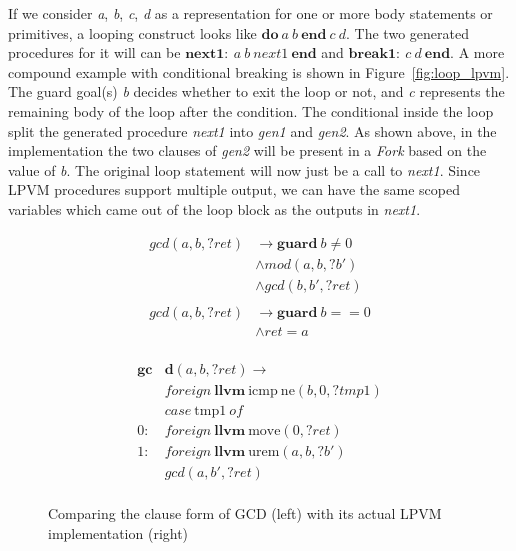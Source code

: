 If we consider \textit{a}, \textit{b}, \textit{c}, \textit{d} as a
representation for one or more body statements or primitives, a looping
construct looks like \( \mathbf{do}\ a\ b\ \mathbf{end}\ c\ d\). The two
generated procedures for it will can be
\( \mathbf{next1:}\ a\ b\ next1\ \mathbf{end} \) and
\( \mathbf{break1:}\ c\ d\ \mathbf{end} \). A more compound example with
conditional breaking is shown in Figure~\ref{fig:loop_lpvm}. The guard goal(s)
\textit{b} decides whether to exit the loop or not, and \textit{c} represents
the remaining body of the loop after the condition. The conditional inside the
loop split the generated procedure \textit{next1} into \textit{gen1} and
\textit{gen2}. As shown above, in the implementation the two clauses of
\textit{gen2} will be present in a \textit{Fork} based on the value of
\textit{b}. The original loop statement will now just be a call to
\textit{next1}. Since LPVM procedures support multiple output, we can have the
same scoped variables which came out of the loop block as the outputs in
\textit{next1}.


\begin{figure}
  \noindent
  \begin{minipage}{0.2\textwidth}
    \begin{align*}
      gcd(a,b,?ret) &\rightarrow \mathbf{guard}\ b \neq 0 \\
                    &\wedge mod(a,b,?b') \\
                    &\wedge gcd(b,b',?ret) \\
      \\
      gcd(a,b,?ret) &\rightarrow \mathbf{guard}\ b == 0 \\
                    &\wedge ret=a \\
    \end{align*}
  \end{minipage}
  \qquad\vrule
  \begin{minipage}{0.4\textwidth}
        \begin{align*}
      \mathbf{gc}&\mathbf{d}(a,b,?ret) \rightarrow \\
          & foreign\ \mathbf{llvm}\ \mathrm{icmp}\ \mathrm{ne}(b,0,?tmp1) \\
          & case\ \mathrm{tmp1}\ of \\
      0:\ & foreign\ \mathbf{llvm}\ \mathrm{move}(0,?ret) \\
      1:\ & foreign\ \mathbf{llvm}\ \mathrm{urem}(a,b,?b') \\
          &  gcd(a,b',?ret) \\
    \end{align*}

    \end{minipage}

    \caption{Comparing the clause form of GCD (left) with its actual LPVM
      implementation (right)}
    \label{fig:gcd_full_imp}
\end{figure}


